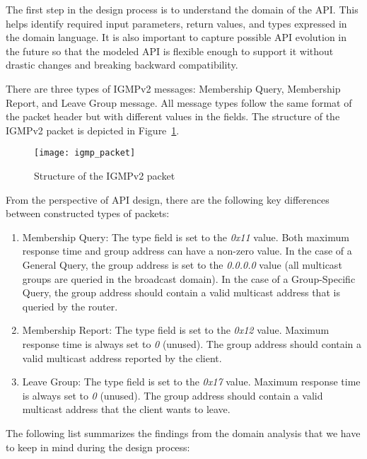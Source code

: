 The first step in the design process is to understand the domain of the API\@.
This helps identify required input parameters, return values, and types expressed in the domain language.
It is also important to capture possible API evolution in the future so that the modeled API is flexible enough
to support it without drastic changes and breaking backward compatibility.

There are three types of IGMPv2 messages: Membership Query, Membership Report, and Leave Group message.
All message types follow the same format of the packet header but with different values in the fields.
The structure of the IGMPv2 packet is depicted in Figure~\ref{fig:igmp_packet}.

\begin{figure}[!htb]
\centering
\texttt{[image: igmp\_packet]}
\caption{Structure of the IGMPv2 packet}
\label{fig:igmp_packet}
\end{figure}

From the perspective of API design, there are the following key differences between constructed types of packets:

\begin{enumerate}
    \item Membership Query:
    The type field is set to the \textit{0x11} value.
    Both maximum response time and group address can have a non-zero value.
    In the case of a General Query, the group address is set to the \textit{0.0.0.0} value
    (all multicast groups are queried in the broadcast domain).
    In the case of a Group-Specific Query, the group address should contain a valid multicast address
    that is queried by the router.
    \item Membership Report:
    The type field is set to the \textit{0x12} value.
    Maximum response time is always set to \textit{0} (unused).
    The group address should contain a valid multicast address reported by the client.
    \item Leave Group:
    The type field is set to the \textit{0x17} value.
    Maximum response time is always set to \textit{0} (unused).
    The group address should contain a valid multicast address that the client wants to leave.
\end{enumerate}

The following list summarizes the findings from the domain analysis that we have to keep in mind during
the design process:

